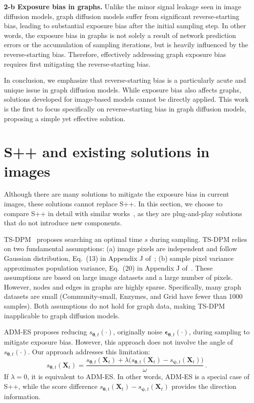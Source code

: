 \documentclass{article}
\newcommand{\X}{{{\bm X}}}
\newcommand{\THETA}{{\bm\theta}}
\newcommand{\PSI}{{\bm\psi}}
\begin{document}
\textbf{2-b Exposure bias in graphs.} Unlike the minor signal leakage seen in image diffusion models, graph diffusion models suffer from significant reverse-starting bias, leading to substantial exposure bias after the initial sampling step. In other words, the exposure bias in graphs is not solely a result of network prediction errors or the accumulation of sampling iterations, but is heavily influenced by the reverse-starting bias. Therefore, effectively addressing graph exposure bias requires first mitigating the reverse-starting bias.

In conclusion, we emphasize that reverse-starting bias is a particularly acute and unique issue in graph diffusion models. While exposure bias also affects graphs, solutions developed for image-based models cannot be directly applied. This work is the first to focus specifically on reverse-starting bias in graph diffusion models, proposing a simple yet effective solution. 
\section{S++ and existing solutions in images}
\label{appendix:I.s++ and existing solutions}
Although there are many solutions to mitigate the exposure bias in current images, these solutions cannot replace S++. In this section, we choose to compare S++ in detail with similar works~\citep{li2024alleviating,ningelucidating}, as they are plug-and-play solutions that do not introduce new components.

TS-DPM~\citep{li2024alleviating} proposes searching an optimal time $s$ during sampling. TS-DPM relies on two fundamental assumptions: (a) image pixels are independent and follow Gaussian distribution, Eq.~(13) in Appendix J of~\cite{li2024alleviating}; (b) sample pixel variance approximates population variance, Eq.~(20) in Appendix J of~\cite{li2024alleviating}. These assumptions are based on large image datasets and a large number of pixels. However, nodes and edges in graphs are highly sparse. Specifically, many graph datasets are small (Community-small, Enzymes, and Grid have fewer than 1000 samples). Both assumptions do not hold for graph data, making TS-DPM inapplicable to graph diffusion models.

ADM-ES\citep{ningelucidating} proposes reducing $s_{\THETA,t}(\cdot)$, originally noise $\bm\epsilon_{\THETA,t}(\cdot)$, during sampling to mitigate exposure bias. However, this approach does not involve the angle of $s_{\THETA,t}(\cdot)$. Our approach addresses this limitation: 
\begin{equation}
s_{\THETA,t}(\X_t)=\frac{s_{\THETA,t}(\X_t)+\lambda\bigl(s_{\THETA,t}(\X_t)-s_{\PSI,t}(\X_t)\bigr)}{\omega}\,.
\end{equation}
If $\lambda=0$, it is equivalent to ADM-ES. In other words, ADM-ES is a special case of S++, while the score difference $s_{\THETA,t}(\X_t)-s_{\PSI,t}(\X_t)$ provides the direction information. 
\end{document}
